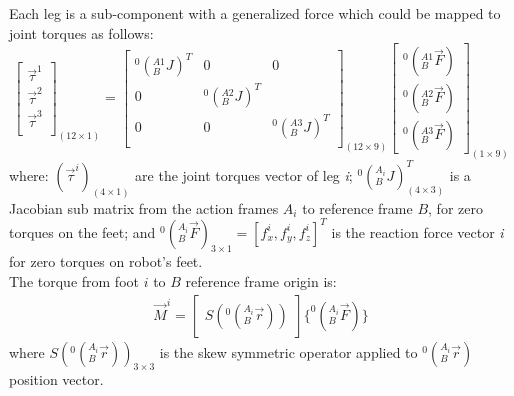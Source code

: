 \documentclass[]{article}
\begin{document}
Each leg is a sub-component with a generalized force which could be mapped to joint torques as follows:
\begin{equation}
\begin{bmatrix}
	\vec{\tau}^1 \\
	\vec{\tau}^2 \\
	\vec{\tau}^3 \\
\end{bmatrix}_{(12\times1)}
=
\begin{bmatrix}
	^0(_B^{A1}J)^T  & 0 				& 0  				\\ 
		0  			& ^0(_B^{A2}J)^T 	&   				\\ 
		0 			& 0 				&^0(_B^{A3}J)^T 	\\ 
\end{bmatrix}_{(12 \times 9)}
\begin{bmatrix}
	^0(_B^{A1}\vec{F}) 	\\
	^0(_B^{A2}\vec{F}) 	\\
	^0(_B^{A3}\vec{F})
\end{bmatrix}_{(1 \times 9)}
\label{eq:parallelVirtualModelEquation}
\end{equation}
where: $(\vec{\tau}^i)_{(4\times1)}$ are the joint torques vector of leg \textit{i}; $^0(_B^{A_i}J)^T_{(4\times 3)}$ is a Jacobian sub matrix from the action frames $A_i$ to reference frame $B$, for zero torques on the feet; and $^0(_B^{A_i}\vec{F})_{3\times1}=[f_x^i,f_y^i,f_z^i]^T$ is the reaction force vector \textit{i} for zero torques on robot's feet.\\
The torque from foot $i$ to $B$ reference frame origin is:
\begin{eqnarray}
\vec{M}^i=%
\begin{bmatrix}
S(^0(_B^{A_i}\vec{r}))
\end{bmatrix}
\{^0(_B^{A_i}\vec{F})\}
\label{eq:equilibrium}
\end{eqnarray}
where $S(^0(_B^{A_i}\vec{r}))_{3 \times 3}$ is the skew symmetric operator applied to $^0(_B^{A_i}\vec{r})$ position vector.\\
\end{document}
